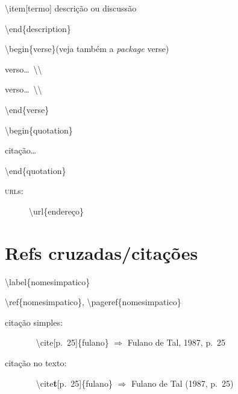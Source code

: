 \documentclass[10pt,twoside,english,brazilian]{article}
\begin{document}
\begin{multicols}{3}
\quad\textbackslash{}item[termo] descrição ou discussão

\textbackslash{}end\{description\}


\vspace{\baselineskip}


\textbackslash{}begin\{verse\}\quad (veja também a \textit{package} \textsf{verse})

\quad verso\dots\ \textbackslash\textbackslash

\quad verso\dots\ \textbackslash\textbackslash

\textbackslash{}end\{verse\}


\vspace{\baselineskip}


\textbackslash{}begin\{quotation\}

\quad citação\dots

\textbackslash{}end\{quotation\}


\vspace{\baselineskip}


\begin{description}
    \item[\textsc{url}s:] \textbackslash{}url\{endereço\}
\end{description}

\section*{Refs cruzadas/citações}

\textbackslash{}label\{nomesimpatico\}

\textbackslash{}ref\{nomesimpatico\},
\textbackslash{}pageref\{nomesimpatico\}


\vspace{\baselineskip}


\begin{description}
\item[citação simples:]~\vspace{2pt}\newline
    \null\quad\textbackslash{}cite[p.~25]\{fulano\} $\Rightarrow$ Fulano de Tal, 1987, p.~25\vspace{6pt}

  \item[citação no texto:]~\vspace{2pt}\newline
    \null\quad\textbackslash{}cite\textbf{t}[p.~25]\{fulano\} $\Rightarrow$ Fulano de Tal (1987, p.~25)\vspace{6pt}


\end{description}
\end{multicols}
\end{document}
